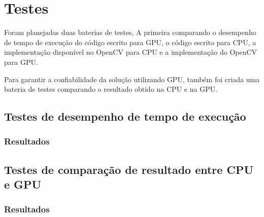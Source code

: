 \chapter{Testes}

Foram planejadas duas baterias de testes, A primeira comparando o desempenho de
tempo de execução do código
escrito para GPU, o código escrito para CPU, a implementação disponível no
OpenCV para CPU e a implementação do OpenCV para GPU.

Para garantir a confiabilidade da solução utilizando GPU, também foi criada uma
bateria de testes comparando o resultado obtido na CPU e na GPU.

\section{Testes de desempenho de tempo de execução}

\subsection{Resultados}

\section{Testes de comparação de resultado entre CPU e GPU}

\subsection{Resultados}

